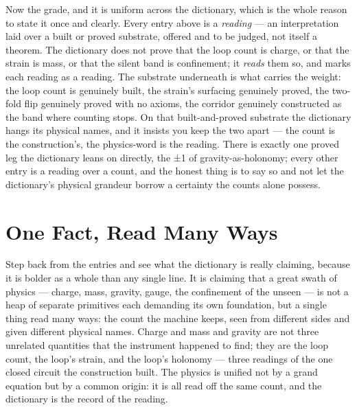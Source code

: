 Now the grade, and it is uniform across the dictionary, which is the whole reason to state it once and clearly.
Every entry above is a \emph{reading} --- an interpretation laid over a built or proved substrate, offered and to
be judged, not itself a theorem. The dictionary does not prove that the loop count is charge, or that the strain
is mass, or that the silent band is confinement; it \emph{reads} them so, and marks each reading as a reading. The
substrate underneath is what carries the weight: the loop count is genuinely built, the strain's surfacing
genuinely proved, the two-fold flip genuinely proved with no axioms, the corridor genuinely constructed as the
band where counting stops. On that built-and-proved substrate the dictionary hangs its physical names, and it
insists you keep the two apart --- the count is the construction's, the physics-word is the reading. There is
exactly one proved leg the dictionary leans on directly, the ±1 of gravity-as-holonomy; every other entry is a
reading over a count, and the honest thing is to say so and not let the dictionary's physical grandeur borrow a
certainty the counts alone possess.

\section{One Fact, Read Many Ways}

Step back from the entries and see what the dictionary is really claiming, because it is bolder as a whole than
any single line. It is claiming that a great swath of physics --- charge, mass, gravity, gauge, the confinement of
the unseen --- is not a heap of separate primitives each demanding its own foundation, but a single thing read
many ways: the count the machine keeps, seen from different sides and given different physical names. Charge and
mass and gravity are not three unrelated quantities that the instrument happened to find; they are the loop count,
the loop's strain, and the loop's holonomy --- three readings of the one closed circuit the construction built.
The physics is unified not by a grand equation but by a common origin: it is all read off the same count, and the
dictionary is the record of the reading.

